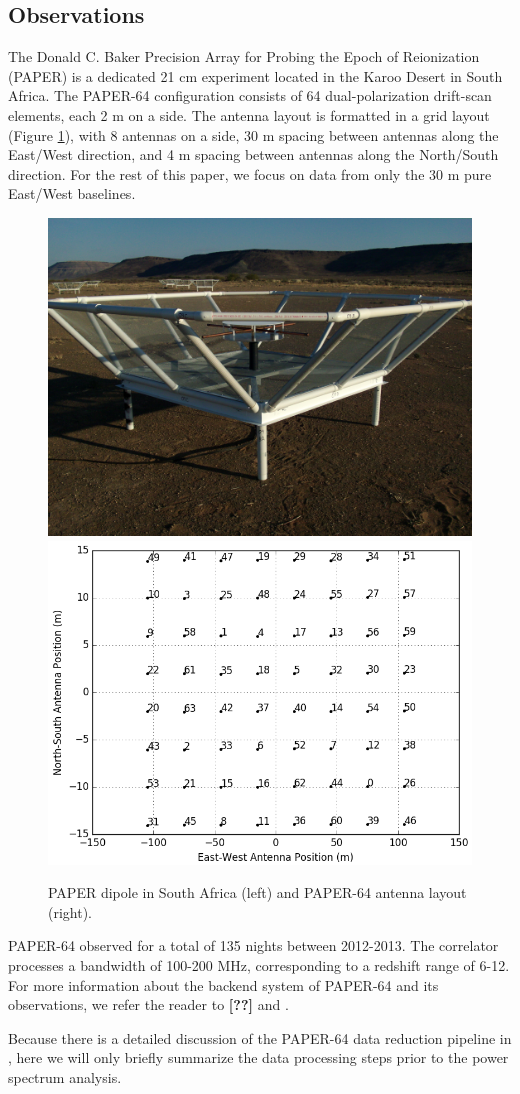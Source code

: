 \documentclass[preprint2,numberedappendix,tighten,twocolappendix]{aastex6}  %
\newcommand{\cc}[1]{{\color{purple} \textbf{[#1]}}}
\begin{document}
\subsection{Observations}
\label{sec:Obs}

The Donald C. Baker Precision Array for Probing the Epoch of Reionization (PAPER) is a dedicated 21 cm experiment located in the Karoo Desert in South Africa. The PAPER-64 configuration consists of 64 dual-polarization drift-scan elements, each 2 m on a side. The antenna layout is formatted in a grid layout (Figure \ref{fig:paper}), with 8 antennas on a side, 30 m spacing between antennas along the East/West direction, and 4 m spacing between antennas along the North/South direction. For the rest of this paper, we focus on data from only the 30 m pure East/West baselines. 

\begin{figure}
	\centering
	\includegraphics[height=0.35\textwidth]{plots/paper_dipole.png}
	\includegraphics[height=0.35\textwidth]{plots/antenna_layout.png}
	\caption{PAPER dipole in South Africa (left) and PAPER-64 antenna layout (right).}
	\label{fig:paper}
\end{figure}

PAPER-64 observed for a total of 135 nights between 2012-2013. The correlator processes a bandwidth of 100-200 MHz, corresponding to a redshift range of 6-12. For more information about the backend system of PAPER-64 and its observations, we refer the reader to \cc{??} and \citet{ali_et_al2015}.

Because there is a detailed discussion of the PAPER-64 data reduction pipeline in \citet{ali_et_al2015}, here we will only briefly summarize the data processing steps prior to the power spectrum analysis. 
\end{document}
